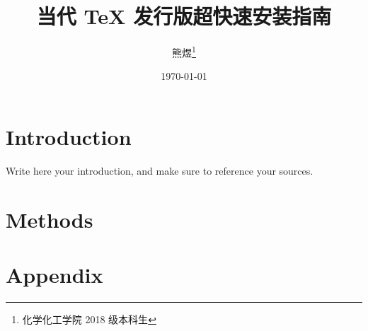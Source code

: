 \documentclass{kaohandt}
\begin{document}
\pagestyle{plain}

\title{当代 {\TeX{}} 发行版超快速安装指南}

\author{熊\hspace{1em}煜\thanks{化学化工学院 2018 级本科生}}

\date{\today}

\maketitle
\bigskip
\bigskip
\zhlipsum[1]
\tableofcontents

\clearpage


\section{Introduction}

Write here your introduction, and make sure to
reference your sources.

\blindtext\sidenote{\blindtext}

\section{Methods}
\zhlipsum

\appendix %

\section{Appendix}

\blindtext





\printbibliography[title=Bibliography] %
\end{document}
